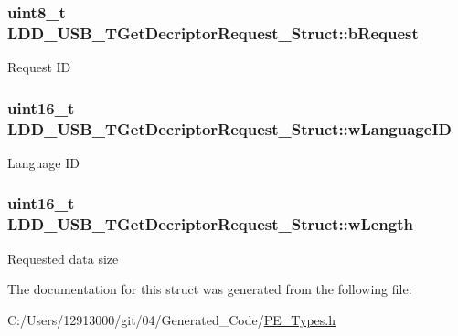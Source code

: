 \subsubsection[{b\+Request}]{\setlength{\rightskip}{0pt plus 5cm}uint8\+\_\+t L\+D\+D\+\_\+\+U\+S\+B\+\_\+\+T\+Get\+Decriptor\+Request\+\_\+\+Struct\+::b\+Request}\label{struct_l_d_d___u_s_b___t_get_decriptor_request___struct_aa7651472aa5110086f335c0b79c0bc5b}
Request I\+D \hypertarget{struct_l_d_d___u_s_b___t_get_decriptor_request___struct_a228c41af26c45c1fa18d964c0702a4b4}{}
\subsubsection[{w\+Language\+I\+D}]{\setlength{\rightskip}{0pt plus 5cm}uint16\+\_\+t L\+D\+D\+\_\+\+U\+S\+B\+\_\+\+T\+Get\+Decriptor\+Request\+\_\+\+Struct\+::w\+Language\+I\+D}\label{struct_l_d_d___u_s_b___t_get_decriptor_request___struct_a228c41af26c45c1fa18d964c0702a4b4}
Language I\+D \hypertarget{struct_l_d_d___u_s_b___t_get_decriptor_request___struct_af9ac7409b4031aa6f3ec5da9d79b06eb}{}
\subsubsection[{w\+Length}]{\setlength{\rightskip}{0pt plus 5cm}uint16\+\_\+t L\+D\+D\+\_\+\+U\+S\+B\+\_\+\+T\+Get\+Decriptor\+Request\+\_\+\+Struct\+::w\+Length}\label{struct_l_d_d___u_s_b___t_get_decriptor_request___struct_af9ac7409b4031aa6f3ec5da9d79b06eb}
Requested data size 

The documentation for this struct was generated from the following file\+:\begin{DoxyCompactItemize}
\item 
C\+:/\+Users/12913000/git/04/\+Generated\+\_\+\+Code/\hyperlink{_p_e___types_8h}{P\+E\+\_\+\+Types.\+h}\end{DoxyCompactItemize}
